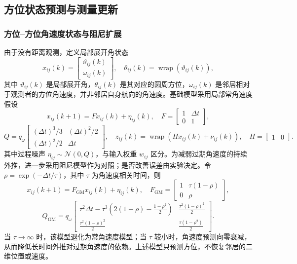 \documentclass[UTF8,fontset=windows,11pt]{ctexart}
\begin{document}
\subsection{方位状态预测与测量更新}
\subsubsection{方位--方位角速度状态与阻尼扩展}
由于没有距离观测，定义局部展开角状态
\begin{equation}
 x_{ij}(k)=\begin{bmatrix}\vartheta_{ij}(k)\\ \omega_{ij}(k)\end{bmatrix},
 \quad \theta_{ij}(k)=\operatorname{wrap}(\vartheta_{ij}(k)),
\end{equation}
其中 $\vartheta_{ij}(k)$ 是局部展开角，$\theta_{ij}(k)$ 是其对应的圆周方位，$\omega_{ij}(k)$ 是邻居相对于观测者的方位角速度，并非邻居自身航向的角速度。基础模型采用局部常角速度假设
\begin{equation}
 x_{ij}(k+1)=F x_{ij}(k)+\eta_{ij}(k),
 \quad F=\begin{bmatrix}1&\Delta t\\0&1\end{bmatrix},
\end{equation}
\begin{equation}
 Q=q_\omega\begin{bmatrix}(\Delta t)^3/3&(\Delta t)^2/2\\(\Delta t)^2/2&\Delta t\end{bmatrix},
 \quad z_{ij}(k)=\operatorname{wrap}(Hx_{ij}(k)+\nu_{ij}(k)),\quad H=\begin{bmatrix}1&0\end{bmatrix}.
\end{equation}
其中过程噪声 $\eta_{ij}\sim\mathcal N(0,Q)$，与输入权重 $w_{ij}$ 区分。为减弱过期角速度的持续外推，进一步采用阻尼模型作为对照；是否改善误差由实验决定。令
$\rho=\exp(-\Delta t/\tau)$，其中 $\tau$ 为角速度相关时间，则
\begin{equation}
 x_{ij}(k+1)=F_{\mathrm{GM}}x_{ij}(k)+\eta_{ij}(k),
 \quad
 F_{\mathrm{GM}}=\begin{bmatrix}1&\tau(1-\rho)\\0&\rho\end{bmatrix},
\end{equation}
\begin{equation}
 Q_{\mathrm{GM}}=q_\omega
 \begin{bmatrix}
 \tau^2\Delta t-\tau^3\left(2(1-\rho)-\frac{1-\rho^2}{2}\right)
 & \frac{\tau^2(1-\rho)^2}{2}\\[2mm]
 \frac{\tau^2(1-\rho)^2}{2}
 & \frac{\tau(1-\rho^2)}{2}
 \end{bmatrix}.
\end{equation}
当 $\tau\to\infty$ 时，该模型退化为常角速度模型；当 $\tau$ 较小时，角速度预测向零衰减，从而降低长时间外推对过期角速度的依赖。上述模型只预测方位，不恢复邻居的二维位置或速度。
\end{document}
